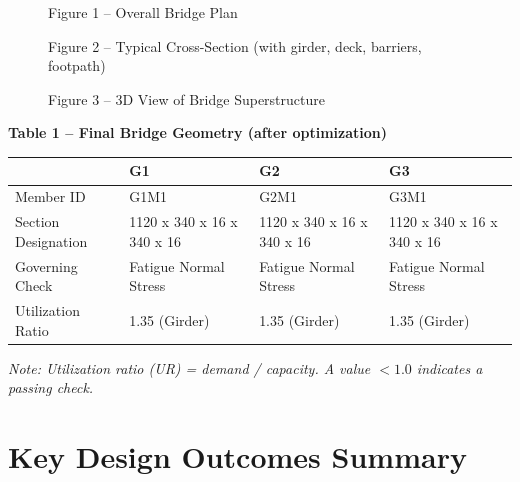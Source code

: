 \documentclass[12pt,a4paper]{report}
\numberwithin{table}{chapter}
\numberwithin{figure}{chapter}
\begin{document}
\begin{figure}[H]
\centering
{}
\caption*{Figure 1 -- Overall Bridge Plan}
\end{figure}

\newpage

\begin{figure}[H]
\centering
{}
\caption*{Figure 2 -- Typical Cross-Section (with girder, deck, barriers, footpath)}
\end{figure}

\begin{figure}[H]
\centering
{}
\caption*{Figure 3 -- 3D View of Bridge Superstructure}
\end{figure}

\noindent\textbf{Table 1 -- Final Bridge Geometry (after optimization)}

\vspace{0.4em}
\noindent
\begin{tabular}{|C{2.8cm}|C{4.1cm}|C{4.1cm}|C{4.1cm}|}
\hline
  \textbf{} &
  \textbf{G1} &
  \textbf{G2} &
  \textbf{G3} \\
\hline
Member ID & G1M1 & G2M1 & G3M1 \\
\hline
Section Designation & 1120 x 340 x 16 x 340 x 16 & 1120 x 340 x 16 x 340 x 16 & 1120 x 340 x 16 x 340 x 16 \\
\hline
Governing Check & Fatigue Normal Stress & Fatigue Normal Stress & Fatigue Normal Stress \\
\hline
Utilization Ratio & 1.35 (Girder) & 1.35 (Girder) & 1.35 (Girder) \\
\hline
\end{tabular}

\vspace{0.4em}
\noindent\textit{Note: Utilization ratio (UR) = demand / capacity. A value $< 1.0$ indicates a passing check.}

\vspace{1em}

\section*{Key Design Outcomes Summary}
\label{sec:key-outcomes}
\end{document}
